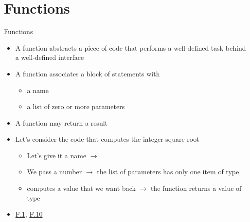 

\section*{Functions}

\begin{frame}[fragile]{Functions}

  \begin{itemize}[<+->]
  \item A function abstracts a piece of code that performs a well-defined task
    behind a well-defined interface
  \item A function associates a block of statements with
    \begin{itemize}
    \item a name
    \item a list of zero or more parameters
    \end{itemize}
  \item A function may return a result
  \end{itemize}

  \begin{itemize}[<+->]
  \item Let's consider the code that computes the integer square root
    \begin{itemize}
    \item Let's give it a name $\rightarrow$ 
    \item We pass  a number $\rightarrow$ the list of parameters has
      only one item of type 
    \item {} computes a value that we want back $\rightarrow$ the
      function returns a value of type 
    \end{itemize}
  \end{itemize}

  \begin{itemize}[<+->]
  \item \href{https://isocpp.github.io/CppCoreGuidelines/CppCoreGuidelines#f1-package-meaningful-operations-as-carefully-named-functions}{F.1}, \href{https://isocpp.github.io/CppCoreGuidelines/CppCoreGuidelines#f10-if-an-operation-can-be-reused-give-it-a-name}{F.10}
  \end{itemize}
\end{frame}

